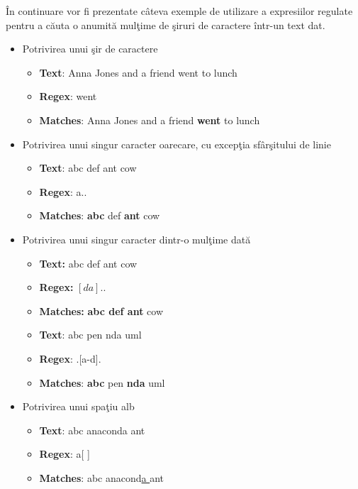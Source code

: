 În continuare vor fi prezentate câteva exemple de utilizare a expresiilor regulate pentru a căuta o anumită mulţime de şiruri de caractere într-un text dat.

\begin{itemize} 
\item {Potrivirea unui şir de caractere} 
	\begin{itemize}
	\item
	\textbf{Text}:    Anna Jones and a friend went to lunch 
	\item
	\textbf{Regex}:    went 
	\item
	\textbf{Matches}: Anna Jones and a friend \textbf{went} to lunch 
	\end{itemize}
	
\item {Potrivirea unui singur caracter oarecare, cu excepţia sfârşitului de linie}
	\begin{itemize}
	\item
	\textbf{Text}:       abc def ant cow 	
	\item
	\textbf{Regex}:    a.. 	
	\item
	\textbf{Matches}: \textbf{abc} def \textbf{ant} cow 
	\end{itemize}
 
\item {Potrivirea unui singur caracter dintr-o mulţime dată}
	\begin{itemize}
		\item \textbf{Text:} \space abc def ant cow
		\item \textbf{Regex:} \space $[da]..$
		\item \textbf{Matches:} \space \textbf{abc def ant} cow
		\newline
		
		\item
		\textbf{Text}:	abc pen nda uml
		\item
		\textbf{Regex}:		.[a-d].
		\item
		\textbf{Matches}:	\textbf{abc} pen \textbf{nda} uml
	\end{itemize}

\item {Potrivirea unui spaţiu alb}
	\begin{itemize}
	\item
		\textbf{Text}:	  abc anaconda ant
	\item
		\textbf{Regex}:    a[ ] 
	\item
		\textbf{Matches}:  abc anacond\underline{a }ant
	\end{itemize}


\end{itemize}
